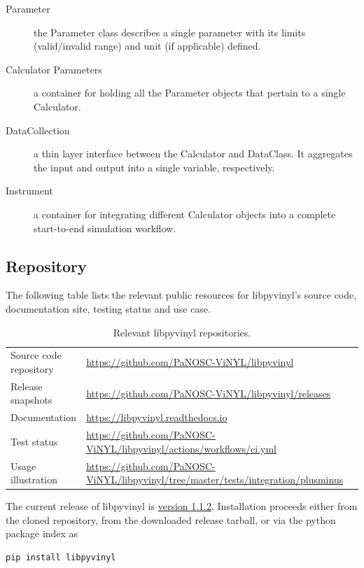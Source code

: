 \documentclass[11pt, a4paper]{article}
\begin{document}
\begin{description}
\item[Parameter] the Parameter class describes a single parameter with its limits (valid/invalid range) and unit (if applicable) defined.
\item[Calculator Parameters] a container for holding all the Parameter objects that pertain to a single Calculator.
\item[DataCollection] a thin layer interface between the Calculator and DataClass. It aggregates the input and output into a single variable, respectively.
\item[Instrument] a container for integrating different Calculator objects into a complete start-to-end simulation workflow.
\end{description}


\subsection{Repository}
\label{sec:lpv_repo}

The following table lists the relevant public resources for
libpyvinyl's source code, documentation site, testing status and use case.
\begin{table}[ht]
  \label{tab:lpv_repos}
  \centering
  \begin{center}
    \caption{Relevant libpyvinyl repositories.}
    \begin{tabular}{l p{10cm}l}
      \hline
      Source code repository & \url{https://github.com/PaNOSC-ViNYL/libpyvinyl} \\
      Release snapshots & \url{https://github.com/PaNOSC-ViNYL/libpyvinyl/releases}\\
      Documentation & \url{https://libpyvinyl.readthedocs.io}\\
      Test status  & \url{https://github.com/PaNOSC-ViNYL/libpyvinyl/actions/workflows/ci.yml}\\
      Usage illustration & \url{https://github.com/PaNOSC-ViNYL/libpyvinyl/tree/master/tests/integration/plusminus}\\
      \hline
    \end{tabular}
  \end{center}
\end{table}

The current release of libpyvinyl is
\href{https://github.com/PaNOSC-ViNYL/libpyvinyl/releases/tag/v1.1.2}{version 1.1.2}. Installation proceeds either from the cloned repository, from the
downloaded release tarball, or via the python package index as
\begin{lstlisting}[language=Python]
pip install libpyvinyl
\end{lstlisting}
\end{document}
